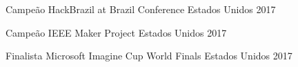 


\begin{cvhonors}

  \cvhonor
    {Campeão}
    {HackBrazil at Brazil Conference}
    {Estados Unidos}
    {2017} %

  \cvhonor
    {Campeão}
    {IEEE Maker Project}
    {Estados Unidos}
    {2017} %

  \cvhonor
    {Finalista}
    {Microsoft Imagine Cup World Finals}
    {Estados Unidos}
    {2017} %
\end{cvhonors}



